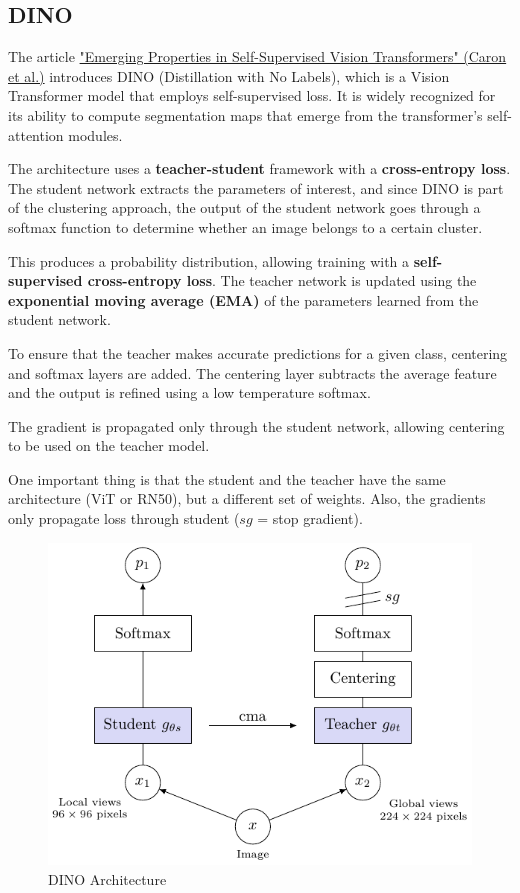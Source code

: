 \subsection{DINO}

The article \href{https://arxiv.org/pdf/2104.14294}{"Emerging Properties in Self-Supervised Vision Transformers" (Caron et al.)} introduces DINO (Distillation with No Labels), which is a Vision Transformer model that employs self-supervised loss. It is widely recognized for its ability to compute segmentation maps that emerge from the transformer's self-attention modules.

The architecture uses a \textbf{teacher-student} framework with a \textbf{cross-entropy loss}. The student network extracts the parameters of interest, and since DINO is part of the clustering approach, the output of the student network goes through a softmax function to determine whether an image belongs to a certain cluster.

This produces a probability distribution, allowing training with a \textbf{self-supervised cross-entropy loss}. The teacher network is updated using the \textbf{exponential moving average (EMA)} of the parameters learned from the student network.

To ensure that the teacher makes accurate predictions for a given class, centering and softmax layers are added. The centering layer subtracts the average feature and the output is refined using a low temperature softmax.

The gradient is propagated only through the student network, allowing centering to be used on the teacher model.

One important thing is that the student and the teacher have the same architecture (ViT or RN50), but a different set of weights. Also, the gradients only propagate loss through
student ($sg$ = stop gradient).

\begin{figure}[!htbp]
    \centering
    \includegraphics[width=0.7\linewidth]{tikz/chapter11 - DINO.pdf}
    \caption{DINO Architecture}
\end{figure}

